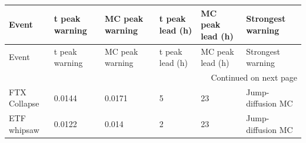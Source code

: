 \begingroup
\scriptsize
\setlength{\tabcolsep}{3pt}
\begin{longtable}{@{}llllll@{}}
\toprule
Event & t peak warning & MC peak warning & t peak lead (h) & MC peak lead (h) & Strongest warning \\
\midrule
\endfirsthead
\toprule
Event & t peak warning & MC peak warning & t peak lead (h) & MC peak lead (h) & Strongest warning \\
\midrule
\endhead
\midrule
\multicolumn{6}{r}{Continued on next page} \\
\midrule
\endfoot
\bottomrule
\endlastfoot
FTX Collapse & 0.0144 & 0.0171 & 5 & 23 & Jump-diffusion MC \\
ETF whipsaw & 0.0122 & 0.014 & 2 & 23 & Jump-diffusion MC \\
\end{longtable}
\endgroup
